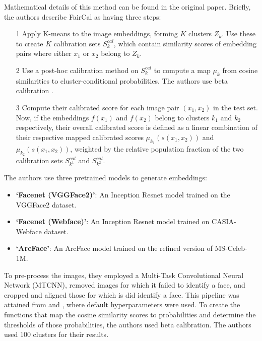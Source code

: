 Mathematical details of this method can be found in the original paper. Briefly, the authors describe FairCal as having three steps:
\begin{itemize}
    \item[1] Apply K-means to the image embeddings, forming $K$ clusters $Z_k$. Use these to create $K$ calibration sets $S^{cal}_k$, which contain similarity scores of embedding pairs where either $x_1$ or $x_2$ belong to $Z_k$.
    \item[2] Use a post-hoc calibration method on $S^{cal}_k$ to compute a map $\mu_k$ from cosine similarities to cluster-conditional probabilities. The authors use beta calibration \citep{kull2017beta}.
    \item[3] Compute their calibrated score for each image pair $(x_1, x_2)$ in the test set. Now, if the embeddings $f(x_1)$ and $f(x_2)$ belong to clusters $k_1$ and $k_2$ respectively, their overall calibrated score is defined as a linear combination of their respective mapped calibrated scores $\mu_{k_1}(s(x_1, x_2))$ and $\mu_{k_2}(s(x_1, x_2))$, weighted by the relative population fraction of the two calibration sets $S^{cal}_{k^1}$ and $S^{cal}_{k^2}$.
\end{itemize}
The authors use three pretrained models to generate embeddings:
 \begin{itemize}
     \item \textbf{`Facenet (VGGFace2)'}: An Inception Resnet model trained on the VGGFace2 dataset.
     \item \textbf{`Facenet (Webface)'}: An Inception Resnet model trained on CASIA-Webface dataset.
     \item \textbf{`ArcFace'}: An ArcFace model trained on the refined version of MS-Celeb-1M.
 \end{itemize}
 To pre-process the images, they employed a Multi-Task Convolutional Neural Network (MTCNN), removed images for which it failed to identify a face, and cropped and aligned those for which is did identify a face. This pipeline was attained from \citep{facenetpytorch} and \citep{arcface}, where default hyperparameters were used. To create the functions that map the cosine similarity scores to probabilities and determine the thresholds of those probabilities, the authors used beta calibration. The authors used 100 clusters for their results.

